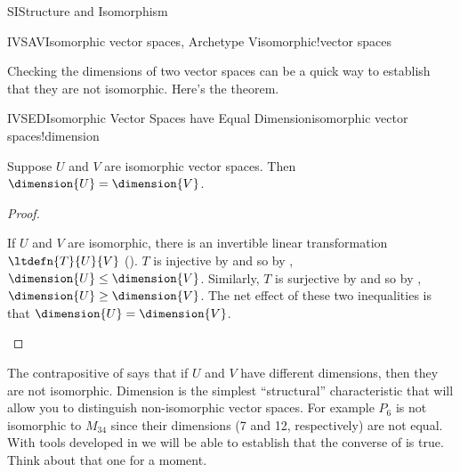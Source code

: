 \begin{subsect}{SI}{Structure and Isomorphism}
\begin{example}{IVSAV}{Isomorphic vector spaces, Archetype V}{isomorphic!vector spaces}
%
\end{example}
%
\begin{para}Checking the dimensions of two vector spaces can be a quick way to establish that they are not isomorphic.  Here's the theorem.\end{para}
%
\begin{theorem}{IVSED}{Isomorphic Vector Spaces have Equal Dimension}{isomorphic vector spaces!dimension}
\begin{para}Suppose $U$ and $V$ are isomorphic vector spaces.  Then $\dimension{U}=\dimension{V}$.\end{para}
\end{theorem}
%
\begin{proof}
\begin{para}If $U$ and $V$ are isomorphic, there is an invertible linear transformation $\ltdefn{T}{U}{V}$ ().  $T$ is injective by  and so by , $\dimension{U}\leq\dimension{V}$.  Similarly, $T$ is surjective by  and so by , $\dimension{U}\geq\dimension{V}$.  The net effect of these two inequalities is that $\dimension{U}=\dimension{V}$.\end{para}
\end{proof}
%
\begin{para}The contrapositive of  says that if $U$ and $V$ have different dimensions, then they are not isomorphic.  Dimension is the simplest ``structural'' characteristic that will allow you to distinguish non-isomorphic vector spaces.  For example $P_6$ is not isomorphic to $M_{34}$ since their dimensions (7 and 12, respectively) are not equal.  With tools developed in  we will be able to establish that the converse of  is true.  Think about that one for a moment.\end{para}
%
\end{subsect}
%
